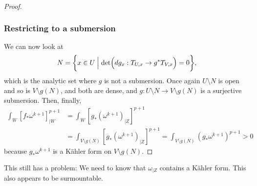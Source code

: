 \documentclass[11pt]{amsart}
\theoremstyle{definition}
\begin{document}
\begin{proof}
\subsubsection*{Restricting to a submersion}

We can now look at
\[
N = 
\biggl\{
x \in U 
\Bigm| \det \Bigl( dg_x : T_{U,x} \to g^*T_{V,x} \Bigr) = 0 
\biggr\},
\]
which is the analytic set where $g$ is not a submersion.
Once again $U \setminus N$ is open and so is $V \setminus g(N)$, and both are dense, and $g : U \setminus N \to V \setminus g(N)$ is a surjective submersion.
Then, finally,
\begin{align*}
\int_W [f_*\omega^{k+1}]_{|W}^{p+1}
&= \int_W [g_*(\omega^{k+1})_{|Z}]^{p+1}
\\
&= \int_{V \setminus g(N)} [g_*(\omega^{k+1})_{|Z}]^{p+1}
= \int_{V \setminus g(N)} (g_*\omega^{k+1})^{p+1} > 0
\end{align*}
because $g_*\omega^{k+1}$ is a K\"ahler form on $V \setminus g(N)$. 
\end{proof}


This still has a problem:
We need to know that $\omega_{|Z}$ contains a K\"ahler form.
This also appears to be surmountable.





\end{document}
